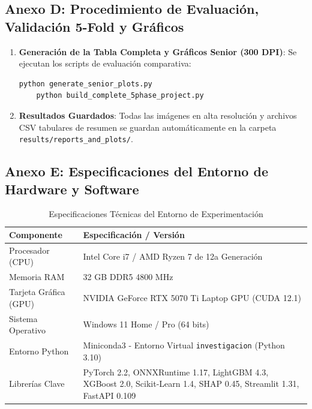 \subsection{Anexo D: Procedimiento de Evaluación, Validación 5-Fold y Gráficos}
\begin{enumerate}[leftmargin=*]
    \item \textbf{Generación de la Tabla Completa y Gráficos Senior (300 DPI)}: Se ejecutan los scripts de evaluación comparativa:
    \begin{lstlisting}[language=bash]
    python generate_senior_plots.py
    python build_complete_5phase_project.py
    \end{lstlisting}
    \item \textbf{Resultados Guardados}: Todas las imágenes en alta resolución y archivos CSV tabulares de resumen se guardan automáticamente en la carpeta \texttt{results/reports\_and\_plots/}.
\end{enumerate}

\subsection{Anexo E: Especificaciones del Entorno de Hardware y Software}
\begin{table}[H]
\centering
\caption{Especificaciones Técnicas del Entorno de Experimentación}
\label{tab:especificaciones_hardware}
\small
\begin{tabular}{lp{9.5cm}}
\toprule
\textbf{Componente} & \textbf{Especificación / Versión} \\
\midrule
Procesador (CPU) & Intel Core i7 / AMD Ryzen 7 de 12a Generación \\
Memoria RAM & 32 GB DDR5 4800 MHz \\
Tarjeta Gráfica (GPU) & NVIDIA GeForce RTX 5070 Ti Laptop GPU (CUDA 12.1) \\
Sistema Operativo & Windows 11 Home / Pro (64 bits) \\
Entorno Python & Miniconda3 - Entorno Virtual \texttt{investigacion} (Python 3.10) \\
Librerías Clave & PyTorch 2.2, ONNXRuntime 1.17, LightGBM 4.3, XGBoost 2.0, Scikit-Learn 1.4, SHAP 0.45, Streamlit 1.31, FastAPI 0.109 \\
\bottomrule
\end{tabular}
\end{table}

